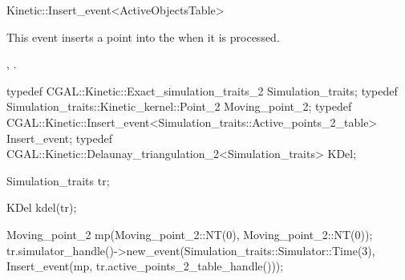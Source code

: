 

\begin{ccRefClass}{Kinetic::Insert_event<ActiveObjectsTable>}  %


\ccDefinition
  
This event inserts a point into the  when it
is processed.


\ccIsModel
{}

\ccCreation
{}  %



\ccSeeAlso

,
.

\ccExample

\begin{ccExampleCode}
typedef CGAL::Kinetic::Exact_simulation_traits_2 Simulation_traits;
typedef Simulation_traits::Kinetic_kernel::Point_2 Moving_point_2;
typedef CGAL::Kinetic::Insert_event<Simulation_traits::Active_points_2_table> Insert_event;
typedef CGAL::Kinetic::Delaunay_triangulation_2<Simulation_traits> KDel;

Simulation_traits tr;

KDel kdel(tr);

Moving_point_2 mp(Moving_point_2::NT(0),
                  Moving_point_2::NT(0));
tr.simulator_handle()->new_event(Simulation_traits::Simulator::Time(3), 
                                 Insert_event(mp,
			                      tr.active_points_2_table_handle()));

\end{ccExampleCode}




\end{ccRefClass}


